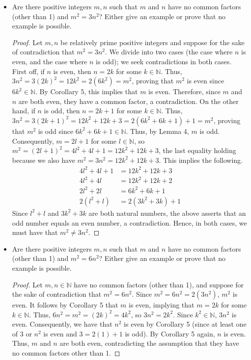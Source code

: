 \documentclass[titlepage]{article}
\newtheorem{corollary}{Corollary}
\newcommand{\N}{\mathbb{N}}
\begin{document}
\begin{itemize}
\begin{corollary}
\begin{proof}
        \end{proof}
    \end{corollary}
    \item Are there positive integers $m,n$ such that $m$ and $n$ have no common factors (other than 1) and $m^2=3n^2$? Either give an example or prove that no example is possible.
    \begin{proof}
        Let $m,n$ be relatively prime positive integers and suppose for the sake of contradiction that $m^2=3n^2$. We divide into two cases (the case where $n$ is even, and the case where $n$ is odd); we seek contradictions in both cases. First off, if $n$ is even, then $n=2k$ for some $k\in\N$. Thus, $3n^2=3(2k)^2=12k^2=2(6k^2)=m^2$, proving that $m^2$ is even since $6k^2\in\N$. By Corollary 5, this implies that $m$ is even. Therefore, since $m$ and $n$ are both even, they have a common factor, a contradiction. On the other hand, if $n$ is odd, then $n=2k+1$ for some $k\in\N$. Thus, $3n^2=3(2k+1)^2=12k^2+12k+3=2(6k^2+6k+1)+1=m^2$, proving that $m^2$ is odd since $6k^2+6k+1\in\N$. Thus, by Lemma 4, $m$ is odd. Consequently, $m=2l+1$ for some $l\in\N$, so $m^2=(2l+1)^2=4l^2+4l+1=12k^2+12k+3$, the last equality holding because we also have $m^2=3n^2=12k^2+12k+3$. This implies the following.
        \begin{align*}
            4l^2+4l+1 &= 12k^2+12k+3\\
            4l^2+4l &= 12k^2+12k+2\\
            2l^2+2l &= 6k^2+6k+1\\
            2(l^2+l) &= 2(3k^2+3k)+1
        \end{align*}
        Since $l^2+l$ and $3k^2+3k$ are both natural numbers, the above asserts that an odd number equals an even number, a contradiction. Hence, in both cases, we must have that $m^2\neq 3n^2$.
    \end{proof}
    \item Are there positive integers $m,n$ such that $m$ and $n$ have no common factors (other than 1) and $m^2=6n^2$? Either give an example or prove that no example is possible.
    \begin{proof}
        Let $m,n\in\N$ have no common factors (other than 1), and suppose for the sake of contradiction that $m^2=6n^2$. Since $m^2=6n^2=2(3n^2)$, $m^2$ is even. It follows by Corollary 5 that $m$ is even, implying that $m=2k$ for some $k\in\N$. Thus, $6n^2=m^2=(2k)^2=4k^2$, so $3n^2=2k^2$. Since $k^2\in\N$, $3n^2$ is even. Consequently, we have that $n^2$ is even by Corollary 5 (since at least one of 3 or $n^2$ is even and $3=2(1)+1$ is odd). By Corollary 5 again, $n$ is even. Thus, $m$ and $n$ are both even, contradicting the assumption that they have no common factors other than 1.

\end{proof}
\end{itemize}
\end{document}
